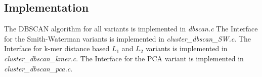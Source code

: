 \subsection{Implementation}

The DBSCAN algorithm for all variants is implemented in \emph{dbscan.c}
The Interface for the Smith-Waterman variants is implemented in
\emph{cluster\_dbscan\_SW.c}.
The Interface for k-mer distance based $L_1$ and $L_2$ variants is
implemented in \emph{cluster\_dbscan\_kmer.c}.
The Interface for the PCA variant is implemented in
\emph{cluster\_dbscan\_pca.c}.









    
